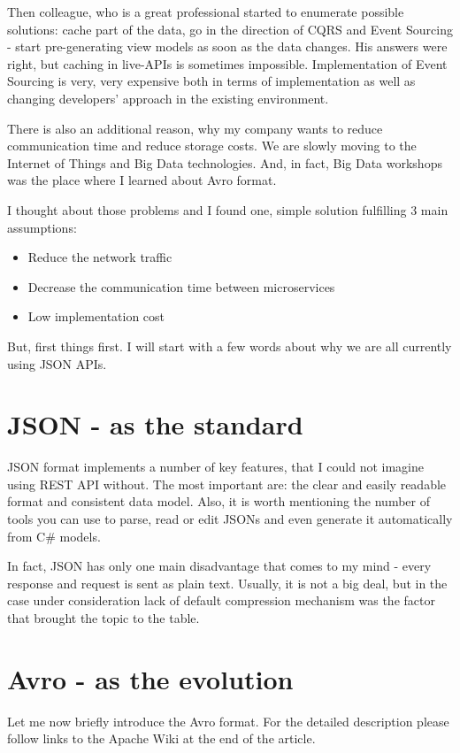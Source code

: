 \documentclass[]{article}
\begin{document}
Then colleague, who is a great professional started to enumerate possible solutions: cache part of the data, go in the direction of CQRS and Event Sourcing - start pre-generating view models as soon as the data changes. His answers were right, but caching in live-APIs is sometimes impossible. Implementation of Event Sourcing is very, very expensive both in terms of implementation as well as changing developers' approach in the existing environment.

There is also an additional reason, why my company wants to reduce communication time and reduce storage costs. We are slowly moving to the Internet of Things and Big Data technologies. And, in fact, Big Data workshops was the place where I learned about Avro format.

I thought about those problems and I found one, simple solution fulfilling 3 main assumptions:
\begin{itemize}
	\item Reduce the network traffic 
	\item Decrease the communication time between microservices 
	\item Low implementation cost
\end{itemize}


But, first things first. I will start with a few words about why we are all currently using JSON APIs.


\section{JSON - as the standard}
JSON format implements a number of key features, that I could not imagine using REST API without. The most important are: the clear and easily readable format and consistent data model. Also, it is worth mentioning the number of tools you can use to parse, read or edit JSONs and even generate it automatically from C\# models.

In fact, JSON has only one main disadvantage that comes to my mind - every response and request is sent as plain text. Usually, it is not a big deal, but in the case under consideration lack of default compression mechanism was the factor that brought the topic to the table.


\section{Avro - as the evolution}

Let me now briefly introduce the Avro format. For the detailed description please follow links to the Apache Wiki at the end of the article.
\end{document}
